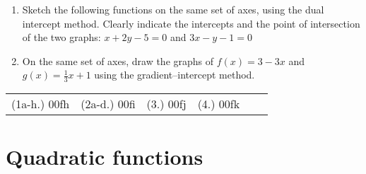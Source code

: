 \begin{exercises}{}
{\begin{enumerate}[noitemsep, label=\textbf{\arabic*}. ]
\begin{figure}[H]
\end{figure}  


\item Sketch the following functions on the same set of axes, using the dual intercept method. Clearly indicate the intercepts and the point of intersection of the two graphs: $x+2y-5=0$ and $3x-y-1=0$
\item On the same set of axes, draw the graphs of $f(x)=3-3x$ and $g(x)=\frac{1}{3}x+1$ using the gradient--intercept method.
\end{enumerate}
\practiceinfo
\par 
\par \begin{tabular}[h]{cccccc}
(1a-h.) 00fh&  (2a-d.) 00fi&  (3.) 00fj& (4.) 00fk\end{tabular}
}
\end{exercises}
   


\section{Quadratic functions}

